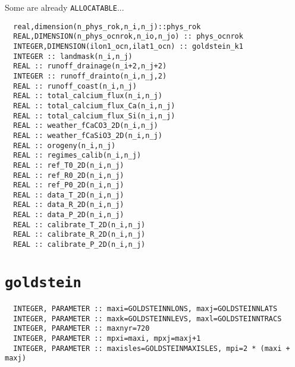 \documentclass[a4paper,10pt,article]{memoir}
\begin{document}
Some are already \texttt{ALLOCATABLE}...

\begin{verbatim}
  real,dimension(n_phys_rok,n_i,n_j)::phys_rok
  REAL,DIMENSION(n_phys_ocnrok,n_io,n_jo) :: phys_ocnrok
  INTEGER,DIMENSION(ilon1_ocn,ilat1_ocn) :: goldstein_k1
  INTEGER :: landmask(n_i,n_j)
  REAL :: runoff_drainage(n_i+2,n_j+2)
  INTEGER :: runoff_drainto(n_i,n_j,2)
  REAL :: runoff_coast(n_i,n_j)
  REAL :: total_calcium_flux(n_i,n_j)
  REAL :: total_calcium_flux_Ca(n_i,n_j)
  REAL :: total_calcium_flux_Si(n_i,n_j)
  REAL :: weather_fCaCO3_2D(n_i,n_j)
  REAL :: weather_fCaSiO3_2D(n_i,n_j)
  REAL :: orogeny(n_i,n_j)
  REAL :: regimes_calib(n_i,n_j)
  REAL :: ref_T0_2D(n_i,n_j)
  REAL :: ref_R0_2D(n_i,n_j)
  REAL :: ref_P0_2D(n_i,n_j)
  REAL :: data_T_2D(n_i,n_j)
  REAL :: data_R_2D(n_i,n_j)
  REAL :: data_P_2D(n_i,n_j)
  REAL :: calibrate_T_2D(n_i,n_j)
  REAL :: calibrate_R_2D(n_i,n_j)
  REAL :: calibrate_P_2D(n_i,n_j)
\end{verbatim}

\section{\texttt{goldstein}}

\begin{verbatim}
  INTEGER, PARAMETER :: maxi=GOLDSTEINNLONS, maxj=GOLDSTEINNLATS
  INTEGER, PARAMETER :: maxk=GOLDSTEINNLEVS, maxl=GOLDSTEINNTRACS
  INTEGER, PARAMETER :: maxnyr=720
  INTEGER, PARAMETER :: mpxi=maxi, mpxj=maxj+1
  INTEGER, PARAMETER :: maxisles=GOLDSTEINMAXISLES, mpi=2 * (maxi + maxj)
\end{verbatim}
\end{document}
